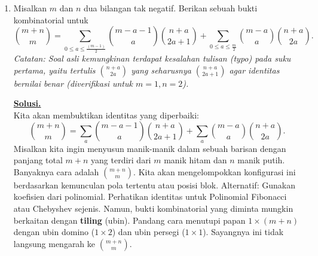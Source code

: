 \documentclass[12pt,twoside]{article}
\newenvironment{solution}
{
	\par\noindent\textbf{\underline{Solusi.}}\\
}
{
	\par
}
\begin{document}
\begin{enumerate}
\begin{solution}
          \textbf{Kasus Himpunan B:}
          Himpunan $B = \{ x \in G \mid x^2 \neq e \}$.
          Kondisi $x^2 \neq e$ setara dengan $x \neq x^{-1}$.
          Kita kelompokkan seluruh elemen $G$ berdasarkan pasangan inversnya: $\{x, x^{-1}\}$.
          \begin{itemize}
            \item Jika $x = x^{-1}$, maka $x^2 = e$. Elemen ini \textbf{tidak} masuk $B$.
            \item Jika $x \neq x^{-1}$, maka pasangan $\{x, x^{-1}\}$ terdiri dari dua elemen berbeda. Kedua elemen ini memenuhi syarat $x^2 \neq e$?
                  Periksa: Jika $x \in B$, maka $x^2 \neq e \iff x \neq x^{-1}$. Maka inversnya $x^{-1}$ juga memiliki sifat $(x^{-1})^2 = x^{-2} \neq e$ (karena jika $x^{-2}=e \implies x^2=e$).
                  Jadi $x \in B \iff x^{-1} \in B$.
          \end{itemize}
          Jadi himpunan $B$ dapat dipartisi menjadi pasangan-pasangan disjoint berbentuk $\{x, x^{-1}\}$ dimana $x \neq x^{-1}$.
          Maka $|B|$ adalah jumlahan dari ukuran pasangan-pasangan tersebut (setiap pasangan ukuran 2).
          $|B| = 2j$ untuk suatu integer $j$. Jadi $|B|$ genap.
        \end{solution}

  \item Misalkan $m$ dan $n$ dua bilangan tak negatif. Berikan sebuah bukti kombinatorial untuk $$\binom{m+n}{m}=\sum_{0\leq a\leq \frac{(m-1)}{2}}\binom{m-a-1}{a}\binom{n+a}{2a+1}+\sum_{0\leq a\leq \frac{m}{2}}\binom{m-a}{a}\binom{n+a}{2a}.$$
        \textit{Catatan: Soal asli kemungkinan terdapat kesalahan tulisan (typo) pada suku pertama, yaitu tertulis $\binom{n+a}{2a}$ yang seharusnya $\binom{n+a}{2a+1}$ agar identitas bernilai benar (diverifikasi untuk $m=1, n=2$).}
        \begin{solution}
          Kita akan membuktikan identitas yang diperbaiki:
          $$ \binom{m+n}{m} = \sum_{a} \binom{m-a-1}{a} \binom{n+a}{2a+1} + \sum_{a} \binom{m-a}{a} \binom{n+a}{2a}. $$
          Misalkan kita ingin menyusun manik-manik dalam sebuah barisan dengan panjang total $m+n$ yang terdiri dari $m$ manik hitam dan $n$ manik putih. Banyaknya cara adalah $\binom{m+n}{m}$.
          Kita akan mengelompokkan konfigurasi ini berdasarkan kemunculan pola tertentu atau posisi blok.
          Alternatif: Gunakan koefisien dari polinomial.
          Perhatikan identitas untuk Polinomial Fibonacci atau Chebyshev sejenis.
          Namun, bukti kombinatorial yang diminta mungkin berkaitan dengan \textbf{tiling} (ubin).
          Pandang cara menutupi papan $1 \times (m+n)$ dengan ubin domino ($1 \times 2$) dan ubin persegi ($1 \times 1$).
          Sayangnya ini tidak langsung mengarah ke $\binom{m+n}{m}$.


\end{solution}
\end{enumerate}
\end{document}
